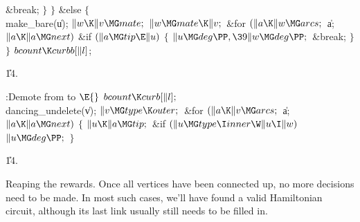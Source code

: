 \&{break};\6
\4${}\}{}$\2\2\6
\4${}\}{}$\5
\2\&{else}\5
${}\{{}$\1\6
\\{make\_bare}(\|u);\6
${}\|w\K\|v\MG\\{mate};{}$\6
${}\|w\MG\\{mate}\K\|v;{}$\6
\&{for} ${}(\|a\K\|w\MG\\{arcs};{}$ \|a; ${}\|a\K\|a\MG\\{next}){}$\1\6
\&{if} ${}(\|a\MG\\{tip}\E\|u){}$\5
${}\{{}$\1\6
${}\|u\MG\\{deg}\PP,\39\|w\MG\\{deg}\PP;{}$\6
\&{break};\6
\4${}\}{}$\2\2\6
\4${}\}{}$\2\6
${}\\{bcount}\K\\{curbb}[\|l]{}$;\par
\U14.\fi

\B{}:Demote  from  to \X${}\E{}$\6
$\\{bcount}\K\\{curb}[\|l];{}$\6
\\{dancing\_undelete}(\|v);\6
${}\|v\MG\\{type}\K\\{outer};{}$\6
\&{for} ${}(\|a\K\|v\MG\\{arcs};{}$ \|a; ${}\|a\K\|a\MG\\{next}){}$\5
${}\{{}$\1\6
${}\|u\K\|a\MG\\{tip};{}$\6
\&{if} ${}(\|u\MG\\{type}\I\\{inner}\W\|u\I\|w){}$\1\5
${}\|u\MG\\{deg}\PP;{}$\2\6
\4${}\}{}$\2\par
\U14.\fi

Reaping the rewards. Once all vertices have been connected up,
no more decisions need to be made. In most such cases, we'll have found a
valid Hamiltonian circuit, although its last link usually still needs
to be filled in.

